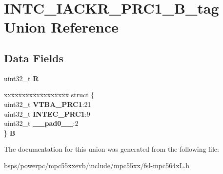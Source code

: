 \hypertarget{unionINTC__IACKR__PRC1__32B__tag}{}\section{I\+N\+T\+C\+\_\+\+I\+A\+C\+K\+R\+\_\+\+P\+R\+C1\+\_\+B\+\_\+tag Union Reference}
\label{unionINTC__IACKR__PRC1__32B__tag}
\subsection*{Data Fields}
\begin{DoxyCompactItemize}
\item 
\mbox{\label{unionINTC__IACKR__PRC1__32B__tag_ae990fb59d60bf67d196f4472bbc5a849}} 
uint32\+\_\+t {\bfseries R}
\item 
\mbox{\label{unionINTC__IACKR__PRC1__32B__tag_a1356ef8ca5853c43ca71a439be382b91}} 
\begin{tabbing}
xx\=xx\=xx\=xx\=xx\=xx\=xx\=xx\=xx\=\kill
struct \{\\
\>uint32\_t {\bfseries VTBA\_PRC1}:21\\
\>uint32\_t {\bfseries INTEC\_PRC1}:9\\
\>uint32\_t {\bfseries \_\_pad0\_\_}:2\\
\} {\bfseries B}\\

\end{tabbing}\end{DoxyCompactItemize}


The documentation for this union was generated from the following file\+:\begin{DoxyCompactItemize}
\item 
bsps/powerpc/mpc55xxevb/include/mpc55xx/fsl-\/mpc564x\+L.\+h\end{DoxyCompactItemize}
